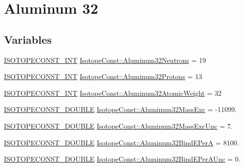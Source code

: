 \hypertarget{group___isotope_const-_aluminum-_al32}{}\section{Aluminum 32}
\label{group___isotope_const-_aluminum-_al32}
\subsection*{Variables}
\begin{DoxyCompactItemize}
\item 
\mbox{\hyperlink{group___isotope_const-_macros_ga5f18360b3e99483a35c32d789e62621c}{I\+S\+O\+T\+O\+P\+E\+C\+O\+N\+S\+T\+\_\+\+I\+NT}} \mbox{\hyperlink{group___isotope_const-_aluminum-_al32_gaa71b23bd915ea768633de294d693b938}{Isotope\+Const\+::\+Aluminum32\+Neutrons}} = 19
\item 
\mbox{\hyperlink{group___isotope_const-_macros_ga5f18360b3e99483a35c32d789e62621c}{I\+S\+O\+T\+O\+P\+E\+C\+O\+N\+S\+T\+\_\+\+I\+NT}} \mbox{\hyperlink{group___isotope_const-_aluminum-_al32_gacc28681f8e12460ec7ff5bbf3e2d317b}{Isotope\+Const\+::\+Aluminum32\+Protons}} = 13
\item 
\mbox{\hyperlink{group___isotope_const-_macros_ga5f18360b3e99483a35c32d789e62621c}{I\+S\+O\+T\+O\+P\+E\+C\+O\+N\+S\+T\+\_\+\+I\+NT}} \mbox{\hyperlink{group___isotope_const-_aluminum-_al32_ga69d6406cdd6c0276214fe59e71171888}{Isotope\+Const\+::\+Aluminum32\+Atomic\+Weight}} = 32
\item 
\mbox{\hyperlink{group___isotope_const-_macros_ga8f45a7272ce02c0b4c65c44636ed719a}{I\+S\+O\+T\+O\+P\+E\+C\+O\+N\+S\+T\+\_\+\+D\+O\+U\+B\+LE}} \mbox{\hyperlink{group___isotope_const-_aluminum-_al32_ga8f6986aaca3d2a696f6cb96f6d7a8e4d}{Isotope\+Const\+::\+Aluminum32\+Mass\+Exc}} = -\/11099.
\item 
\mbox{\hyperlink{group___isotope_const-_macros_ga8f45a7272ce02c0b4c65c44636ed719a}{I\+S\+O\+T\+O\+P\+E\+C\+O\+N\+S\+T\+\_\+\+D\+O\+U\+B\+LE}} \mbox{\hyperlink{group___isotope_const-_aluminum-_al32_ga56d2c06f67d001466dce108e464fa7dc}{Isotope\+Const\+::\+Aluminum32\+Mass\+Exc\+Unc}} = 7.
\item 
\mbox{\hyperlink{group___isotope_const-_macros_ga8f45a7272ce02c0b4c65c44636ed719a}{I\+S\+O\+T\+O\+P\+E\+C\+O\+N\+S\+T\+\_\+\+D\+O\+U\+B\+LE}} \mbox{\hyperlink{group___isotope_const-_aluminum-_al32_gab42b3ea9faac3acb11a32367b27da59c}{Isotope\+Const\+::\+Aluminum32\+Bind\+E\+PerA}} = 8100.
\item 
\mbox{\hyperlink{group___isotope_const-_macros_ga8f45a7272ce02c0b4c65c44636ed719a}{I\+S\+O\+T\+O\+P\+E\+C\+O\+N\+S\+T\+\_\+\+D\+O\+U\+B\+LE}} \mbox{\hyperlink{group___isotope_const-_aluminum-_al32_ga59c16fd25a7d7ed27da96ffb7edc2888}{Isotope\+Const\+::\+Aluminum32\+Bind\+E\+Per\+A\+Unc}} = 0.

\end{DoxyCompactItemize}

